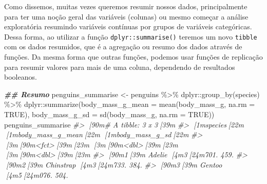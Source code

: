 \documentclass[
]{book}
\newenvironment{Shaded}{\begin{snugshade}}{\end{snugshade}}
\newcommand{\AttributeTok}[1]{\textcolor[rgb]{0.61,0.61,0.61}{#1}}
\newcommand{\CommentTok}[1]{\textcolor[rgb]{0.37,0.37,0.37}{\textit{#1}}}
\newcommand{\ConstantTok}[1]{\textcolor[rgb]{0,0,0}{#1}}
\newcommand{\DocumentationTok}[1]{\textcolor[rgb]{0.37,0.37,0.37}{\textbf{\textit{#1}}}}
\newcommand{\FunctionTok}[1]{\textcolor[rgb]{0,0,0}{#1}}
\newcommand{\NormalTok}[1]{#1}
\newcommand{\OtherTok}[1]{\textcolor[rgb]{0.37,0.37,0.37}{#1}}
\newcommand{\SpecialCharTok}[1]{\textcolor[rgb]{0,0,0}{#1}}
\begin{document}
Como dissemos, muitas vezes queremos resumir nossos dados, principalmente para ter uma noção geral das variáveis (colunas) ou mesmo começar a análise exploratória resumindo variáveis contínuas por grupos de variáveis categóricas. Dessa forma, ao utilizar a função \texttt{dplyr::summarise()} teremos um novo \texttt{tibble} com os dados resumidos, que é a agregação ou resumo dos dados através de funções. Da mesma forma que outras funções, podemos usar funções de replicação para resumir valores para mais de uma coluna, dependendo de resultados booleanos.

\begin{Shaded}
\begin{Highlighting}[]
\DocumentationTok{\#\# Resumo}
\NormalTok{penguins\_summarise }\OtherTok{\textless{}{-}}\NormalTok{ penguins }\SpecialCharTok{\%\textgreater{}\%} 
\NormalTok{  dplyr}\SpecialCharTok{::}\FunctionTok{group\_by}\NormalTok{(species) }\SpecialCharTok{\%\textgreater{}\%} 
\NormalTok{  dplyr}\SpecialCharTok{::}\FunctionTok{summarize}\NormalTok{(}\AttributeTok{body\_mass\_g\_mean =} \FunctionTok{mean}\NormalTok{(body\_mass\_g, }\AttributeTok{na.rm =} \ConstantTok{TRUE}\NormalTok{),}
            \AttributeTok{body\_mass\_g\_sd =} \FunctionTok{sd}\NormalTok{(body\_mass\_g, }\AttributeTok{na.rm =} \ConstantTok{TRUE}\NormalTok{))}
\NormalTok{penguins\_summarise}
\CommentTok{\#\textgreater{} [90m\# A tibble: 3 x 3[39m}
\CommentTok{\#\textgreater{}   [1mspecies[22m   [1mbody\_mass\_g\_mean[22m [1mbody\_mass\_g\_sd[22m}
\CommentTok{\#\textgreater{}   [3m[90m\textless{}fct\textgreater{}[39m[23m                [3m[90m\textless{}dbl\textgreater{}[39m[23m          [3m[90m\textless{}dbl\textgreater{}[39m[23m}
\CommentTok{\#\textgreater{} [90m1[39m Adelie               [4m3[24m701.           459.}
\CommentTok{\#\textgreater{} [90m2[39m Chinstrap            [4m3[24m733.           384.}
\CommentTok{\#\textgreater{} [90m3[39m Gentoo               [4m5[24m076.           504.}


\end{Highlighting}
\end{Shaded}
\end{document}

